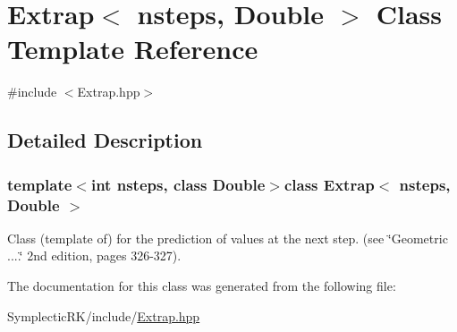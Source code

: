\hypertarget{classExtrap}{\section{Extrap$<$ nsteps, Double $>$ Class Template Reference}
\label{classExtrap}
}


{\ttfamily \#include $<$Extrap.\-hpp$>$}



\subsection{Detailed Description}
\subsubsection*{template$<$int nsteps, class Double$>$class Extrap$<$ nsteps, Double $>$}

Class (template of) for the prediction of values at the next step. (see \char`\"{}\-Geometric ....\char`\"{} 2nd edition, pages 326-\/327). 

The documentation for this class was generated from the following file\-:\begin{DoxyCompactItemize}
\item 
Symplectic\-R\-K/include/\hyperlink{Extrap_8hpp}{Extrap.\-hpp}\end{DoxyCompactItemize}
